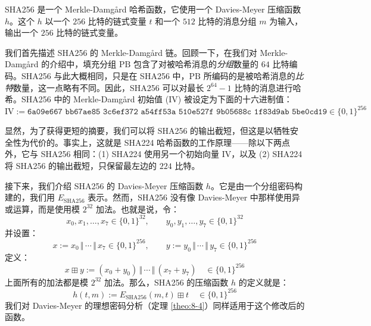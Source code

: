 \begin{snote}[SHA256 函数。]
SHA256 是一个 Merkle-Damg{\aa}rd 哈希函数，它使用一个 Davies-Meyer 压缩函数 $h$。这个 $h$ 以一个 $256$ 比特的链式变量 $t$ 和一个 $512$ 比特的消息分组 $m$ 为输入，输出一个 $256$ 比特的链式变量。

我们首先描述 SHA256 的 Merkle-Damg{\aa}rd 链。回顾一下，在我们对 Merkle-Damg{\aa}rd 的介绍中，填充分组 $\mathrm{PB}$ 包含了对被哈希消息的\emph{分组}数量的 $64$ 比特编码。SHA256 与此大概相同，只是在 SHA256 中，$\mathrm{PB}$ 所编码的是被哈希消息的\emph{比特}数量，这一点略有不同。因此，SHA256 可以对最长 $2^{64}-1$ 比特的消息进行哈希。SHA256 中的 Merkle-Damg{\aa}rd 初始值 (IV) 被设定为下面的十六进制值：
\[
\mathrm{IV}:=\texttt{6a09e667 bb67ae85 3c6ef372 a54ff53a 510e527f 9b05688c 1f83d9ab 5be0cd19}\in\{0,1\}^{256}
\]

显然，为了获得更短的摘要，我们可以将 SHA256 的输出截短，但这是以牺牲安全性为代价的。事实上，这就是 SHA224 哈希函数的工作原理——除以下两点外，它与 SHA256 相同：(1) SHA224 使用另一个初始向量 IV，以及 (2) SHA224 将 SHA256 的输出截短，只保留最左边的 $224$ 比特。

接下来，我们介绍 SHA256 的 Davies-Meyer 压缩函数 $h$。它是由一个分组密码构建的，我们用 $E_\mathrm{SHA256}$ 表示。然而，SHA256 没有像 Davies-Meyer 中那样使用异或运算，而是使用模 $2^{32}$ 加法。也就是说，令：
\[
x_0,x_1,\dots,x_7\in\{0,1\}^{32},
\qquad
y_0,y_1,\dots,y_7\in\{0,1\}^{32}
\]
并设置：
\[
x:=x_0\,\Vert\,\cdots\,\Vert\,x_7\in\{0,1\}^{256},
\qquad
y:=y_0\,\Vert\,\cdots\,\Vert\,y_7\in\{0,1\}^{256}
\]
定义：
\[
x\boxplus y:=(x_0+y_0)\,\Vert\,\cdots\,\Vert\,(x_7+y_7)
\quad
\in\{0,1\}^{256}
\]
上面所有的加法都是模 $2^{32}$ 加法。那么，SHA256 的压缩函数 $h$ 的定义就是：
\[
h(t,m):=E_\mathrm{SHA256}(m,t)\boxplus t
\quad
\in\{0,1\}^{256}
\]
我们对 Davies-Meyer 的理想密码分析（定理 \ref{theo:8-4}）同样适用于这个修改后的函数。
\end{snote}

